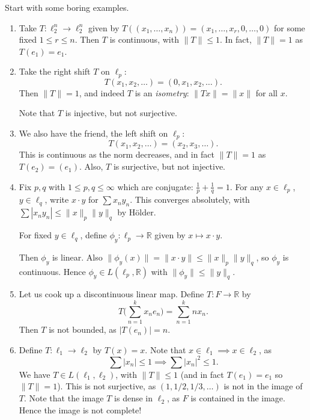 \documentclass[12pt]{article}
\begin{document}
\begin{exbox}
	Start with some boring examples.
	\begin{enumerate}
		\item Take $T : \ell_2^n \to \ell_2^n$ given by $T((x_1, \ldots, x_n)) = (x_1, \ldots, x_r, 0, \ldots, 0)$ for some fixed $1 \leq r \leq n$. Then $T$ is continuous, with $\|T\| \leq 1$. In fact, $\|T\| = 1$ as $T(e_1) = e_1$.
		\item Take the right shift $T$ on $\ell_p$:
			\[
			T(x_1,x_2,\ldots) = (0, x_1, x_2, \ldots).
			\]
		Then $\|T\| = 1$, and indeed $T$ is an \emph{isometry}: $\|Tx\| = \|x\|$ for all $x$.

		Note that $T$ is injective, but not surjective.
		\item We also have the friend, the left shift on $\ell_p$:
			\[
			T(x_1, x_2, \ldots) = (x_2, x_3, \ldots).
			\]
		This is continuous as the norm decreases, and in fact $\|T\| = 1$ as $T(e_2) = (e_1)$. Also, $T$ is surjective, but not injective.
	\item Fix $p, q$ with $1 \leq p, q \leq \infty$ which are conjugate: $\frac{1}{p} + \frac{1}{q} = 1$. For any $x \in \ell_p$, $y \in \ell_q$, write $x \cdot y$ for $\sum x_n y_n$. This converges absolutely, with $\sum |x_ny_n| \leq \|x\|_p \|y\|_q$ by H\"{o}lder.

		For fixed $y \in \ell_q$, define $\phi_y : \ell_p \to \mathbb{R}$ given by $x \mapsto x \cdot y$.

		Then $\phi_y$ is linear. Also $\|\phi_y(x)\| = \|x\cdot y\| \leq \|x\|_p \|y\|_q$, so $\phi_y$ is continuous. Hence $\phi_y \in L(\ell_p, \mathbb{R})$ with $\|\phi_y\| \leq \|y\|_q$.
		\item Let us cook up a discontinuous linear map. Define $T : F \to \mathbb{R}$ by
			\[
			T \Biggl( \sum_{n = 1}^{k} x_n e_n \Biggr) = \sum_{n = 1}^{k} n x_n.
			\]
		Then $T$ is not bounded, as $|T(e_n)| = n$.
	\item Define $T : \ell_1 \to \ell_2$ by $T(x) = x$. Note that $x \in \ell_1 \implies x \in \ell_2$, as
		\[
		\sum |x_n| \leq 1 \implies \sum |x_n|^2 \leq 1.
		\]
		We have $T \in L(\ell_1, \ell_2)$, with $\|T\| \leq 1$ (and in fact $T(e_1) = e_1$ so $\|T\| = 1$). This is not surjective, as $(1, 1/2, 1/3, \ldots)$ is not in the image of $T$. Note that the image $T$ is dense in $\ell_2$, as $F$ is contained in the image. Hence the image is not complete!
	\end{enumerate}
\end{exbox}
\end{document}
